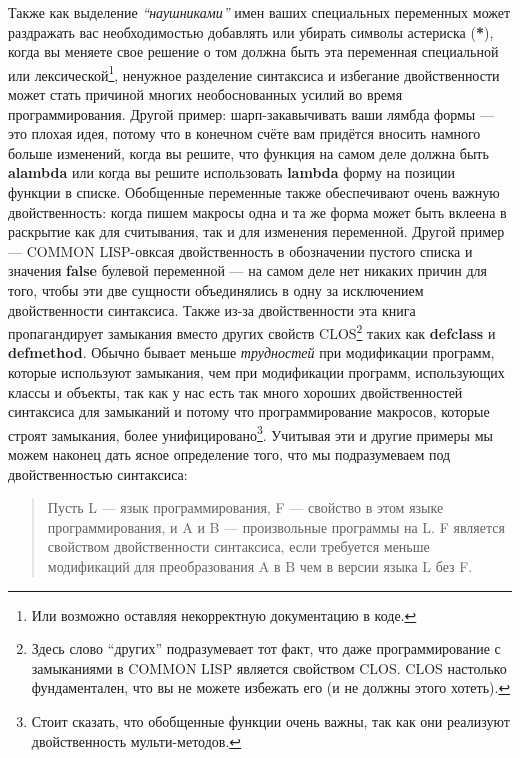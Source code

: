 Также как выделение \emph{``наушниками''} имен ваших специальных переменных может раздражать вас необходимостью добавлять или убирать символы астериска (\textbf{*}), когда вы меняете свое решение о том должна быть эта переменная специальной или лексической\footnote{Или возможно оставляя некорректную документацию в коде.}, ненужное разделение синтаксиса и избегание двойственности может стать причиной многих необоснованных усилий во время программирования. Другой пример: шарп-закавычивать ваши лямбда формы --- это плохая идея, потому что в конечном счёте вам придётся вносить намного больше изменений, когда вы решите, что функция на самом деле должна быть \textbf{alambda} или когда вы решите использовать \textbf{lambda} форму на позиции функции в списке. Обобщенные переменные также обеспечивают очень важную двойственность: когда пишем макросы одна и та же форма может быть вклеена в раскрытие как для считывания, так и для изменения переменной. Другой пример --- COMMON LISP-овксая двойственность в обозначении пустого списка и значения \textbf{false} булевой переменной --- на самом деле нет никаких причин для того, чтобы эти две сущности объединялись в одну за исключением двойственности синтаксиса. Также из-за двойственности эта книга пропагандирует замыкания вместо других свойств CLOS\footnote{Здесь слово ``других'' подразумевает тот факт, что даже программирование с замыканиями в COMMON LISP является свойством CLOS. CLOS настолько фундаментален, что вы не можете избежать его (и не должны этого хотеть).} таких как \textbf{defclass} и \textbf{defmethod}. Обычно бывает меньше \emph{трудностей} при модификации программ, которые используют замыкания, чем при модификации программ, использующих классы и объекты, так как у нас есть так много хороших двойственностей синтаксиса для замыканий и потому что программирование макросов, которые строят замыкания, более унифицировано\footnote{Стоит сказать, что обобщенные функции очень важны, так как они реализуют двойственность мульти-методов.}. Учитывая эти и другие примеры мы можем наконец дать ясное определение того, что мы подразумеваем под двойственностью синтаксиса:

\begin{quote}
Пусть L --- язык программирования, F --- свойство в этом языке программирования, и A и B --- произвольные программы на L. F является свойством двойственности синтаксиса, если требуется меньше модификаций для преобразования A в B чем в версии языка L без F.
\end{quote}


